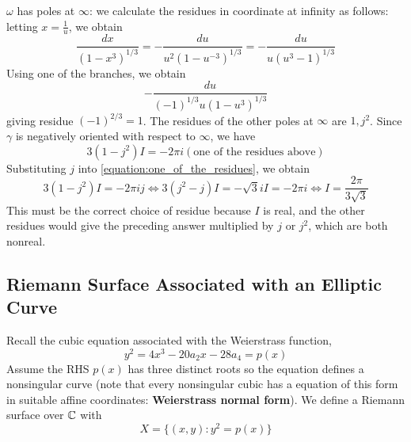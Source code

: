 \documentclass{article}
\begin{document}
\(\omega\) has poles at \(\infty\): we calculate the residues in coordinate at infinity as follows: letting \(x = \frac{1}{u}\), we obtain
\begin{equation}
  \frac{dx}{(1 - x^3)^{1/3}}
  = -\frac{du}{u^2(1 - u^{-3})^{1/3}}
  = -\frac{du}{u(u^3 - 1)^{1/3}}
\end{equation}
Using one of the branches, we obtain
\begin{equation}
  -\frac{du}{(-1)^{1/3}u(1 - u^3)^{1/3}}
\end{equation}
giving residue \((-1)^{2/3} = 1\). The residues of the other poles at \(\infty\) are \(1, j^2\). Since \(\gamma\) is negatively oriented with respect to \(\infty\), we have
\begin{equation}
  3(1 - j^2)I = -2\pi i(\text{one of the residues above})
  \label{equation:one_of_the_residues}
\end{equation}
Substituting \(j\) into \ref{equation:one_of_the_residues}, we obtain
\begin{equation}
  3(1 - j^2)I = -2\pi ij \iff 3(j^2 - j)I = -\sqrt{3}iI = -2\pi i \iff I = \frac{2\pi}{3\sqrt{3}}
\end{equation}
This must be the correct choice of residue because \(I\) is real, and the other residues would give the preceding answer multiplied by \(j\) or \(j^2\), which are both nonreal.

\subsection{Riemann Surface Associated with an Elliptic Curve}

Recall the cubic equation associated with the Weierstrass function,
\begin{equation}y^2 = 4x^3 - 20a_2x - 28a_4 = p(x)\end{equation}
Assume the RHS \(p(x)\) has three distinct roots so the equation defines a nonsingular curve (note that every nonsingular cubic has a equation of this form in suitable affine coordinates: \textbf{Weierstrass normal form}). We define a Riemann surface over \(\mathbb{C}\) with
\begin{equation}
  X = \{(x, y) : y^2 = p(x)\}
\end{equation}

\end{document}
